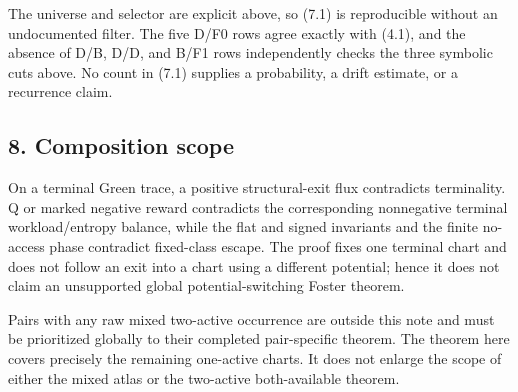 The universe and selector are explicit above, so (7.1) is reproducible
without an undocumented filter. The five D/F0 rows agree exactly with
(4.1), and the absence of D/B, D/D, and B/F1 rows independently checks
the three symbolic cuts above. No count in (7.1) supplies a probability,
a drift estimate, or a recurrence claim.

\subsection{8. Composition scope}

On a terminal Green trace, a positive structural-exit flux contradicts
terminality. Q or marked negative reward contradicts the corresponding
nonnegative terminal workload/entropy balance, while the flat and signed
invariants and the finite no-access phase contradict fixed-class escape.
The proof fixes one terminal chart and does not follow an exit into a
chart using a different potential; hence it does not claim an
unsupported global potential-switching Foster theorem.

Pairs with any raw mixed two-active occurrence are outside this note and
must be prioritized globally to their completed pair-specific theorem.
The theorem here covers precisely the remaining one-active charts. It
does not enlarge the scope of either the mixed atlas or the two-active
both-available theorem.
